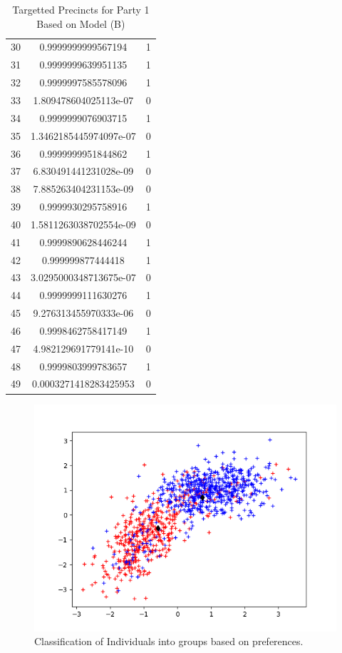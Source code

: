 \documentclass[12pt]{article}
\begin{document}
\begin{enumerate}[label=(\Alph*)]
\begin{enumerate}[label=(\roman*)]
\begin{table}
\begin{tabular}{ |c|c|c| }
						30 &  0.9999999999567194 & 1 \\
						31 &  0.9999999639951135 & 1 \\
						32 &  0.9999997585578096 & 1 \\
						33 &  1.809478604025113e-07 & 0 \\
						34 &  0.9999999076903715 & 1 \\
						35 &  1.3462185445974097e-07 & 0 \\
						36 &  0.9999999951844862 & 1 \\
						37 &  6.830491441231028e-09 & 0 \\
						38 &  7.885263404231153e-09 & 0 \\
						39 &  0.9999930295758916 & 1 \\
						40 &  1.5811263038702554e-09 & 0 \\
						41 &  0.9999890628446244 & 1 \\
						42 &  0.999999877444418 & 1 \\
						43 &  3.0295000348713675e-07 & 0 \\
						44 &  0.9999999111630276 & 1 \\
						45 &  9.276313455970333e-06 & 0 \\
						46 &  0.9998462758417149 & 1 \\
						47 &  4.982129691779141e-10 & 0 \\
						48 &  0.9999803999783657 & 1 \\
						49 &  0.0003271418283425953 & 0  \\
					 \hline
				\end{tabular}
				\caption{Targetted Precincts for Party 1 Based on Model (B)}
				\label{tab:targets_2}
			\end{table}

	  	\begin{figure}[h!]
	  	\centering
	  	\includegraphics{starter/2Bv.png}
	  	\caption{Classification of Individuals into groups based on preferences.}
	  	\label{fig:2Bv}
	  	\end{figure}
	  \end{enumerate}
\end{enumerate}
\end{document}
